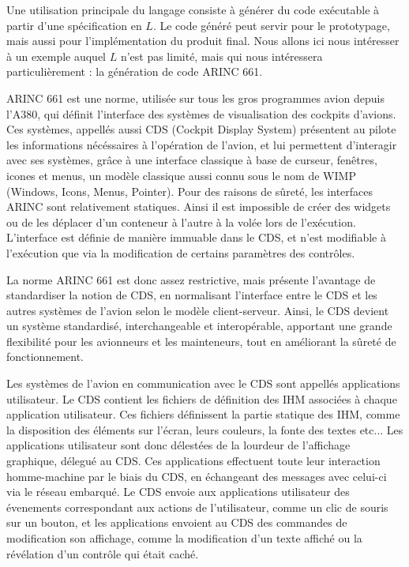 \documentclass{ihm}
\begin{document}
Une utilisation principale du langage consiste à générer du code
exécutable à partir d'une spécification en $L$. Le code généré
peut servir pour le prototypage, mais aussi pour
l'implémentation du produit final. Nous allons ici nous
intéresser à un exemple auquel $L$ n'est pas limité, mais qui
nous intéressera particulièrement : la génération de code ARINC
661.

ARINC 661 est une norme, utilisée sur tous les gros programmes
avion depuis l'A380, qui définit l'interface des systèmes de
visualisation des cockpits d'avions. Ces systèmes, appellés
aussi CDS (Cockpit Display System) présentent au pilote les
informations nécéssaires à l'opération de l'avion, et lui
permettent d'interagir avec ses systèmes, grâce à une interface
classique à base de curseur, fenêtres, icones et menus, un
modèle classique aussi connu sous le nom de WIMP (Windows,
Icons, Menus, Pointer). Pour des raisons de sûreté, les
interfaces ARINC sont relativement statiques. Ainsi il est
impossible de créer des widgets ou de les déplacer d'un
conteneur à l'autre à la volée lors de l'exécution. L'interface
est définie de manière immuable dans le CDS, et n'est modifiable
à l'exécution que via la modification de certains paramètres des
contrôles.

La norme ARINC 661 est donc assez restrictive, mais présente
l'avantage de standardiser la notion de CDS, en normalisant
l'interface entre le CDS et les autres systèmes de l'avion selon
le modèle client-serveur. Ainsi, le CDS devient un système
standardisé, interchangeable et interopérable, apportant une
grande flexibilité pour les avionneurs et les mainteneurs, tout
en améliorant la sûreté de fonctionnement.

Les systèmes de l'avion en communication avec le CDS sont
appellés applications utilisateur. Le CDS contient les fichiers
de définition des IHM associées à chaque application
utilisateur. Ces fichiers définissent la partie statique des
IHM, comme la disposition des éléments sur l'écran, leurs
couleurs, la fonte des textes etc... Les applications
utilisateur sont donc délestées de la lourdeur de l'affichage
graphique, délegué au CDS. Ces applications effectuent toute
leur interaction homme-machine par le biais du CDS, en
échangeant des messages avec celui-ci via le réseau embarqué. Le
CDS envoie aux applications utilisateur des évenements
correspondant aux actions de l'utilisateur, comme un clic de
souris sur un bouton, et les applications envoient au CDS des
commandes de modification son affichage, comme la modification
d'un texte affiché ou la révélation d'un contrôle qui était
caché.
\end{document}
